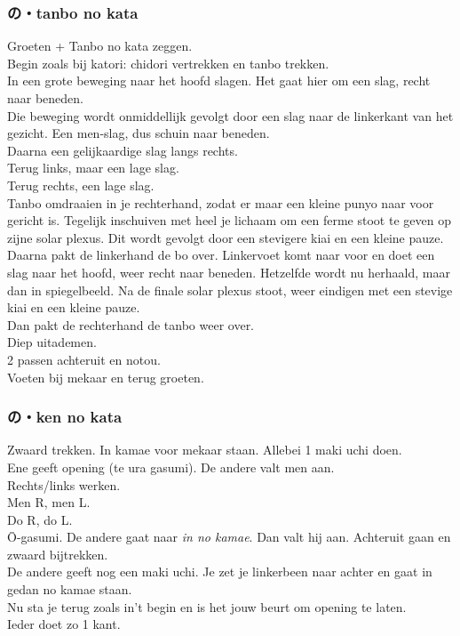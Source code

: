 \subsubsection{の・tanbo no kata}
Groeten + Tanbo no kata zeggen.\\
Begin zoals bij katori: chidori vertrekken en tanbo trekken.\\
In een grote beweging naar het hoofd slagen. Het gaat hier om een slag, recht naar beneden.\\
Die beweging wordt onmiddellijk gevolgt door een slag naar de linkerkant van het gezicht. Een men-slag, dus schuin naar beneden.\\
Daarna een gelijkaardige slag langs rechts.\\
Terug links, maar een lage slag.\\
Terug rechts, een lage slag.\\
Tanbo omdraaien in je rechterhand, zodat er maar een kleine punyo naar voor gericht is. Tegelijk inschuiven met heel je lichaam om een ferme stoot te geven op zijne solar plexus. Dit wordt gevolgt door een stevigere kiai en een kleine pauze.\\
Daarna pakt de linkerhand de bo over. Linkervoet komt naar voor en doet een slag naar het hoofd, weer recht naar beneden. Hetzelfde wordt nu herhaald, maar dan in spiegelbeeld. Na de finale solar plexus stoot, weer eindigen met een stevige kiai en een kleine pauze.\\
Dan pakt de rechterhand de tanbo weer over.\\
Diep uitademen.\\
2 passen achteruit en notou.\\
Voeten bij mekaar en terug groeten.

\subsubsection{の・ken no kata}
Zwaard trekken. In kamae voor mekaar staan. Allebei 1 maki uchi doen.\\
Ene geeft opening (te ura gasumi). De andere valt men aan.\\
Rechts/links werken.\\
Men R, men L.\\
Do R, do L.\\
\={O}-gasumi. De andere gaat naar \textit{in no kamae}. Dan valt hij aan. Achteruit gaan en zwaard bijtrekken.\\
De andere geeft nog een maki uchi. Je zet je linkerbeen naar achter en gaat in gedan no kamae staan.\\
Nu sta je terug zoals in't begin en is het jouw beurt om opening te laten.\\
Ieder doet zo 1 kant.

